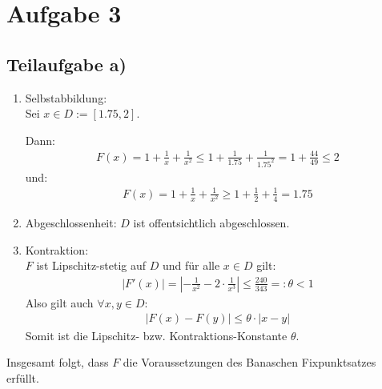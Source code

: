 \section*{Aufgabe 3}
\subsection*{Teilaufgabe a)}

\begin{enumerate}
\item Selbstabbildung: \\
	Sei $x \in D := [1.75 , 2]$.

	Dann:
	\begin{align}
		F(x) = 1 + \frac{1}{x} + \frac{1}{x^2} \le 1 + \frac{1}{1.75} + \frac{1}{1.75^2} = 1 + \frac{44}{49} \le 2
	\end{align}
	und: \\
	\begin{align}
		F(x) = 1 + \frac{1}{x} + \frac{1}{x^2} \ge 1 + \frac{1}{2} + \frac{1}{4} = 1.75
	\end{align}

\item Abgeschlossenheit: $D$ ist offentsichtlich abgeschlossen.
\item Kontraktion: \\
	$F$ ist Lipschitz-stetig auf $D$ und für alle $x \in D$ gilt: \\
	\begin{align}
		|F'(x)| = |-\frac{1}{x^2}-2 \cdot \frac{1}{x^3}| \le \frac{240}{343} =: \theta < 1
	\end{align}
	Also gilt auch $\forall x,y \in D $:
	\begin{align}
		|F(x) - F(y)| \le \theta \cdot |x - y|
	\end{align}
	Somit ist die Lipschitz- bzw. Kontraktions-Konstante $\theta$.
\end{enumerate}
Insgesamt folgt, dass $F$ die Voraussetzungen des Banaschen Fixpunktsatzes erfüllt.
